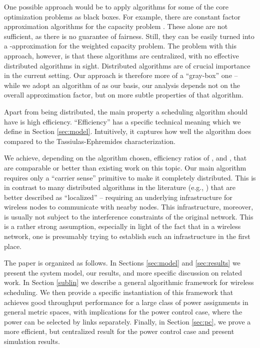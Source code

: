 \documentclass[11pt]{amsart}
\begin{document}
One possible approach would be to apply algorithms for some of the
core optimization problems as black boxes. For example, there are
constant factor approximation algorithms for the capacity problem
\cite{HW09,SODA11,KesselheimSoda11}. These alone are not
sufficient, as there is no guarantee of fairness.  Still, they can be
easily turned into a -approximation for the weighted
capacity problem.  The problem with this approach, however,
is that these algorithms are centralized, with no effective
distributed algorithms in sight.  Distributed algorithms are
 of crucial importance in the current setting.  Our
approach is therefore more of a ``gray-box'' one -- while we adopt an
algorithm of \cite{KV10} as our basis, our analysis depends not on the
overall approximation factor, but on more subtle properties of that
algorithm.


Apart from being distributed, the main property a 
scheduling algorithm should have is high efficiency.
``Efficiency'' has a specific technical meaning which we define in Section \ref{sec:model}.
Intuitively, it captures
how well the algorithm does compared to the Tassiulas-Ephremides characterization.


We achieve, depending on the algorithm chosen, efficiency ratios of
,  and
, that are
comparable or better than existing work on this topic.  Our main
algorithm requires only a ``carrier sense'' primitive to make it
completely distributed.  This is in contrast to many distributed
algorithms in the literature (e.g.,
\cite{DBLP:conf/sigmetrics/ModianoSZ06,lqfmobihoc}) that are better
described as ``localized'' -- requiring an underlying infrastructure
for wireless nodes to communicate with nearby nodes. 
This infrastructure, moreover, is usually not subject to the
interference constraints of the original network.  This is a rather
strong assumption, especially in light of the fact that in a wireless
network, one is presumably trying to establish such an infrastructure
in the first place.

The paper is organized as follows.  In Sections \ref{sec:model} and
\ref{sec:results} we present the system model, our results, and more
specific discussion on related work.  In Section \ref{sublin} we
describe a general algorithmic framework for wireless scheduling. We
then provide a specific instantiation of this framework that achieves
good throughput performance for a large class of power assignments in
general metric spaces, with implications for the power control case, where the power
can be selected by links separately. Finally, in Section \ref{sec:pc}, we
prove a more efficient, but centralized result for the power control case and present simulation results.
\end{document}
